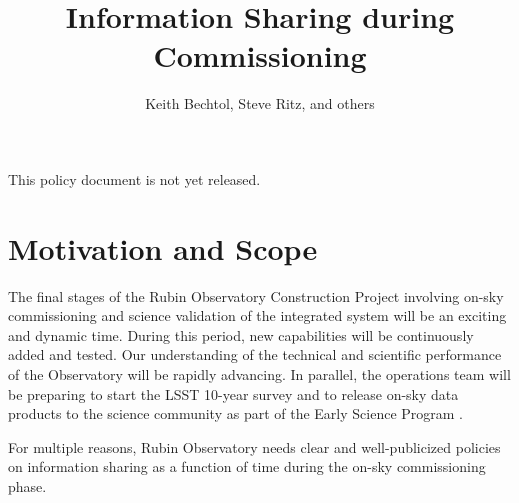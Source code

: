 \documentclass[SE,authoryear,toc,lsstdraft]{lsstdoc}
\title{Information Sharing during Commissioning}
\author{
Keith Bechtol, Steve Ritz, and others
}
\date{\vcsDate}
\begin{document}
\maketitle


\begin{warning}
  This policy document is not yet released.
\end{warning}

\section{Motivation and Scope}

The final stages of the Rubin Observatory Construction Project involving on-sky commissioning and science validation of the integrated system will be an exciting and dynamic time.
During this period, new capabilities will be continuously added and tested.
Our understanding of the technical and scientific performance of the Observatory will be rapidly advancing.
In parallel, the operations team will be preparing to start the LSST 10-year survey and to release on-sky data products to the science community as part of the Early Science Program .

For multiple reasons, Rubin Observatory needs clear and well-publicized policies on information sharing as a function of time during the on-sky commissioning phase.
\end{document}
